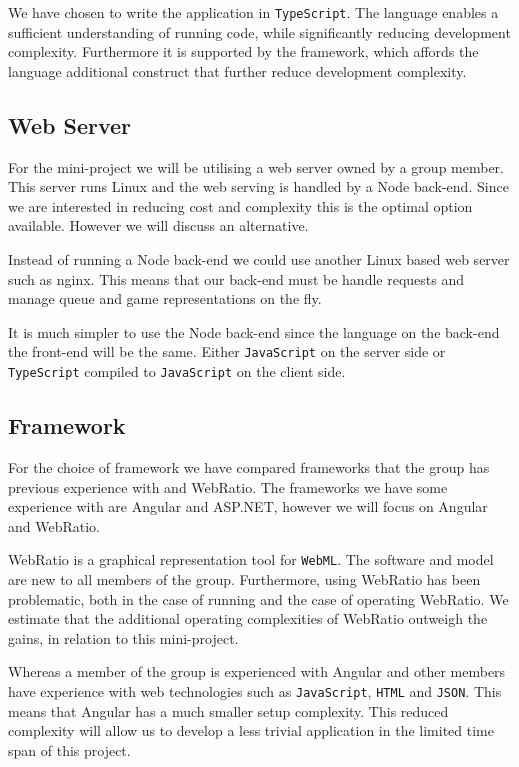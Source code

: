 \documentclass[10pt,a4paper]{report}
\begin{document}
We have chosen to write the application in \texttt{TypeScript}. The language enables a sufficient understanding of running code, while significantly reducing development complexity. Furthermore it is supported by the framework, which affords the language additional construct that further reduce development complexity.

\subsection{Web Server}
For the mini-project we will be utilising a web server owned by a group member. This server runs Linux and the web serving is handled by a Node back-end. Since we are interested in reducing cost and complexity this is the optimal option available. However we will discuss an alternative.

Instead of running a Node back-end we could use another Linux based web server such as nginx. This means that our back-end must be handle requests and manage queue and game representations on the fly.

It is much simpler to use the Node back-end since the language on the back-end the front-end will be the same. Either \texttt{JavaScript} on the server side or \texttt{TypeScript} compiled to \texttt{JavaScript} on the client side.

\subsection{Framework}
For the choice of framework we have compared frameworks that the group has previous experience with and WebRatio. The frameworks we have some experience with are Angular and ASP.NET, however we will focus on Angular and WebRatio.

WebRatio is a graphical representation tool for \texttt{WebML}. The software and model are new to all members of the group. Furthermore, using WebRatio has been problematic, both in the case of running and the case of operating WebRatio. We estimate that the additional operating complexities of WebRatio outweigh the gains, in relation to this mini-project. 

Whereas a member of the group is experienced with Angular and other members have experience with web technologies such as \texttt{JavaScript}, \texttt{HTML} and \texttt{JSON}. This means that Angular has a much smaller setup complexity. This reduced complexity will allow us to develop a less trivial application in the limited time span of this project.
\end{document}
